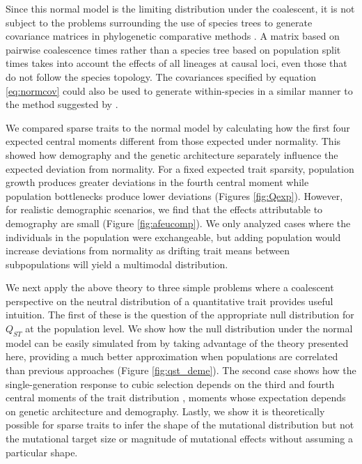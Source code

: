 Since this normal model is the limiting distribution under the coalescent, it is
not subject to the problems surrounding the use of species trees to generate
covariance matrices in phylogenetic comparative methods \citep{Mendes2018}. A
matrix based on pairwise coalescence times rather than a species tree based on
population split times takes into account the effects of all lineages at causal
loci, even those that do not follow the species topology. The covariances
specified by equation \eqref{eq:normcov} could also be used to generate
within-species in a similar manner to the method suggested
by \citet{Felsenstein2002}.

We compared sparse traits to the normal model by calculating how the first four
expected central moments different from those expected under normality. This
showed how demography and the genetic architecture separately influence the
expected deviation from normality. For a fixed expected trait sparsity,
population growth produces greater deviations in the fourth central moment while
population bottlenecks produce lower deviations (Figures
\ref{fig:Qexp}). However, for realistic demographic scenarios,
we find that the effects attributable to demography are small (Figure
\ref{fig:afeucomp}). We only analyzed cases where the individuals in the
population were exchangeable, but adding population would increase deviations
from normality as drifting trait means between subpopulations will yield a
multimodal distribution.

We next apply the above theory to three simple problems where a coalescent
perspective on the neutral distribution of a quantitative trait provides useful
intuition. The first of these is the question of the appropriate null
distribution for $Q_{ST}$ at the population level. We show how the null
distribution under the normal model can be easily simulated from by taking
advantage of the theory presented here, providing a much better approximation
when populations are correlated than previous approaches \citep{Whitlock2009}
(Figure \ref{fig:qst_deme}). The second case shows how the single-generation
response to cubic selection depends on the third and fourth central moments of
the trait distribution \citep{Turelli1990}, moments whose expectation depends on
genetic architecture and demography. Lastly, we show it is theoretically
possible for sparse traits to infer the shape of the mutational distribution but
not the mutational target size or magnitude of mutational effects without
assuming a particular shape.

